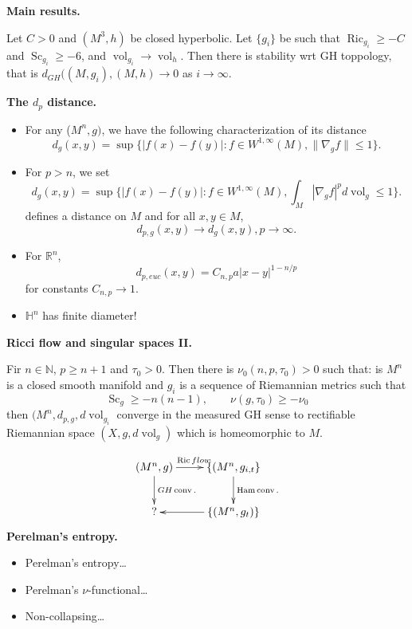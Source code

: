 \medskip\noindent
{\bf Main results.}

\begin{theorem}[L-Lowe, 2026]
\label{theorem-ll}
Let $C>0$ and $(M^3,h)$ be closed
hyperbolic. Let $\{g_i\}$ be such that
$\operatorname{Ric}_{g_i}\geq -C$ and
$\operatorname{Sc}_{g_i} \geq -6$,
and $\operatorname{vol}_{g_i} \to 
\operatorname{vol}_h$.
Then there is stability wrt GH toppology,
that is
$d_{GH}((M,g_i),(M,h) \to 0$ as $i \to \infty$.
\end{theorem}

\medskip\noindent
{\bf The $d_p$ distance.}
\begin{itemize}
\item For any ($M^n,g)$, we have the
following characterization of its distance
$$
d_g(x,y)=
\operatorname{sup}\{|f(x)-f(y)|:
f \in W^{1,\infty}(M),
\|\nabla_gf\| \leq 1\}.
$$
\item For $p>n$, we set
$$
d_g(x,y)=
\operatorname{sup}\{|f(x)-f(y)|:
f \in W^{1,\infty}(M),
\int_M|\nabla_gf|^pd\operatorname{vol}_g \leq 1\}.
$$
defines a distance on $M$ and for all $x,y
\in M$,
$$
d_{p,g}(x,y) \to d_g(x,y), p\to \infty.
$$

\item For $\mathbb{R}^n$,
$$
d_{p, euc}(x,y) = C_{n,p}
a|x-y|^{1-n/p}
$$
for constants $C_{n,p} \to 1$.
\item $\mathbb{H}^n$ has finite diameter!
\end{itemize}

\medskip\noindent
{\bf Ricci flow and singular spaces II.}

\begin{theorem}
\label{theorem-lnn20}
Fir $n \in \mathbb{N}$, $p \geq  n+1$
and $\tau_0 >0$.
Then there is $\nu_0(n,p,\tau_0)>0$ such
that: is $M^n$ is a closed smooth manifold
and $g_i$ is a sequence of Riemannian
metrics such that
$$
\operatorname{Sc}_g \geq 
-n(n-1),\qquad 
\nu(g,\tau_0) \geq 
-\nu_0
$$
then $(M^n,d_{p,g},d\operatorname{vol}_{g_i}$
converge in the measured GH sense to
rectifiable Riemannian space
$(X,g,d\operatorname{vol}_g)$
which is homeomorphic to $M$.
\end{theorem}

$$
\xymatrix{
(M^n,g) \ar[d]^{GH \operatorname{conv}.}
\ar[r]^{\operatorname{Ric} flow}
&\{(M^n,g_{i,t}\}\ar[d]^{\operatorname{Ham}
\operatorname{conv}.}\\
?&  \ar[l]\{(M^n,g_t)\}
}
$$
\medskip\noindent
{\bf Perelman's entropy.}
\begin{itemize}
\item Perelman's entropy…
\item Perelman's $\nu$-functional…
\item Non-collapsing…
\end{itemize}

